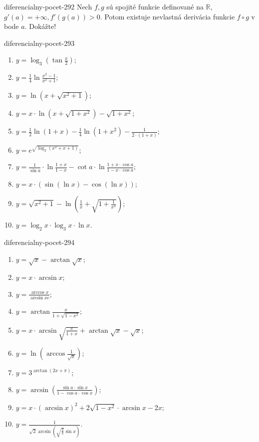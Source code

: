 \begin{defproblem}{diferencialny-pocet-292}
Nech $f,g$ sú spojité funkcie definované na $\mathbb{R}$, $g'(a)=+\infty,f'(g(a))>0$. Potom existuje nevlastná derivácia funkcie $f \circ g$ v bode $a$. Dokážte!
\end{defproblem}

\begin{defproblem}{diferencialny-pocet-293}
\begin{enumerate}
    \item $y=\log_{3}(\tan \frac{x}{2})$;
    \item $y=\frac{1}{4}\ln \frac{x^2-1}{x^2+1}$;
    \item $y=\ln (x+\sqrt{x^2+1})$;
    \item $y=x\cdot\ln (x+\sqrt{1+x^2})-\sqrt{1+x^2}$;
    \item $y=\frac{1}{2} \ln (1+x)-\frac{1}{4} \ln (1+x^2)-\frac{1}{2\cdot(1+x)}$;
    \item $y=e^{\sqrt{\log_2(x^2+x+1)}}$;
    \item $y=\frac{1}{\sin a}\cdot\ln \frac{1+x}{1-x}-\cot a\cdot\ln \frac{1+x\cdot\cos a}{1-x\cdot\cos a}$;
    \item $y=x\cdot(\sin(\ln x)-\cos(\ln x))$;
    \item $y=\sqrt{x^2+1}-\ln (\frac{1}{x}+\sqrt{1+\frac{1}{x^2}})$;
    \item $y=\log_2 x\cdot\log_3 x\cdot\ln x$.
\end{enumerate}
\end{defproblem}

\begin{defproblem}{diferencialny-pocet-294}
\begin{enumerate}
    \item $y=\sqrt{x}-\arctan\sqrt{x}$;
    \item $y=x\cdot\arcsin x$;
    \item $y=\frac{\arccos x}{\arcsin xc}$;
    \item $y=\arctan \frac{x}{1+\sqrt{1-x^2}}$;
    \item $y=x\cdot\arcsin \sqrt{\frac{x}{1+x}}+\arctan \sqrt{x}-\sqrt{x}$;
    \item $y=\ln (\arccos \frac{1}{\sqrt{x}})$;
    \item $y=3^{\arctan(2x+\pi)}$;
    \item $y=\arcsin(\frac{\sin a\cdot \sin x}{1-\cos a\cdot\cos x})$;
    \item $y=x\cdot(\arcsin x)^2+2\sqrt{1-x^2}\cdot\arcsin x-2x$;
    \item $y=\frac{1}{\sqrt{2}\arcsin(\sqrt{\frac{2}{3}}\sin x)}$.
\end{enumerate}
\end{defproblem}

